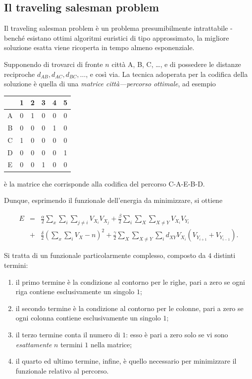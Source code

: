\documentclass[10pt]{book}
\begin{document}
\subsection{Il traveling salesman problem}

Il traveling salesman problem è un problema presumibilmente intrattabile \--
benché esistano ottimi algoritmi euristici di tipo approssimato, la migliore
soluzione esatta viene ricoperta in tempo almeno esponenziale.

Supponendo di trovarci di fronte $n$ città A, B, C, \dots, e di possedere le
distanze reciproche $d_{AB}, d_{AC}, d_{BC}, \dots$, e così via. La tecnica
adoperata per la codifica della soluzione è quella di una \emph{matrice
città\----percorso ottimale}, ad esempio

\begin{table}[ht]
\centering
\begin{tabular}{c|ccccc}
    & 1 & 2 & 3 & 4 & 5 \\
    \hline
A   & 0 & 1 & 0 & 0 & 0 \\
B   & 0 & 0 & 0 & 1 & 0 \\
C   & 1 & 0 & 0 & 0 & 0 \\
D   & 0 & 0 & 0 & 0 & 1 \\
E   & 0 & 0 & 1 & 0 & 0
\end{tabular}
\end{table}
\bigskip

è la matrice che corrisponde alla codifica del percorso C-A-E-B-D.


Dunque, esprimendo il funzionale dell'energia da minimizzare, si ottiene


\begin{eqnarray}\nonumber
    E & = & \frac \alpha 2 \sum _x \sum_i \sum_{j \neq i} V_{X_i}V_{X_j} +
    \frac \beta 2 \sum_i \sum_X \sum_{X \neq Y} V_{X_i}V_{Y_i} \\\nonumber
      & + & \frac \delta 2 (\sum_x \sum_i V_X - n)^2 + \frac \gamma 2 \sum_X
      \sum_{X \neq Y} \sum_i d_{XY} V_{X_i}(V_{Y_{i + 1}} + V_{Y_{i - 1}}).
\end{eqnarray}

Si tratta di un funzionale particolarmente complesso, composto da $4$ distinti termini:
\begin{enumerate}
    \item il primo termine è la condizione al contorno per le righe, pari a
        zero se ogni riga contiene esclusivamente un singolo $1$;
    \item il secondo termine è la condizione al contorno per le colonne, pari a
        zero se ogni colonna contiene esclusivamente un singolo $1$;
    \item il terzo termine conta il numero di $1$: esso è pari a zero solo se
        vi sono \emph{esattamente} $n$ termini $1$ nella matrice;
    \item il quarto ed ultimo termine, infine, è quello necessario per
        minimizzare il funzionale relativo al percorso.
\end{enumerate}
\end{document}
